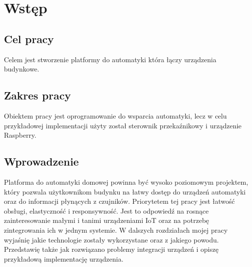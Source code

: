 \chapter{Wstęp}
\section{Cel pracy}
    Celem jest stworzenie platformy do automatyki która łączy urządzenia budynkowe.
\section{Zakres pracy}
Obiektem pracy jest oprogramowanie do wsparcia automatyki, lecz w celu przykładowej implementacji użyty został sterownik przekaźnikowy i urządzenie Raspberry.
\section{Wprowadzenie}
Platforma do automatyki domowej powinna być wysoko poziomowym projektem, który pozwala użytkownikom budynku na łatwy dostęp do urządzeń automatyki oraz do informacji płynących z czujników. Priorytetem tej pracy jest łatwość obsługi, elastyczność i responsywność. Jest to odpowiedź na rosnące zainteresowanie małymi i tanimi urządzeniami IoT oraz na potrzebę zintegrowania ich w jednym systemie. W dalszych rozdziałach mojej pracy wyjaśnię jakie technologie zostały wykorzystane oraz z jakiego powodu.  Przedstawię także jak rozwiązano problemy integracji urządzeń i opiszę przykładową implementację urządzenia.